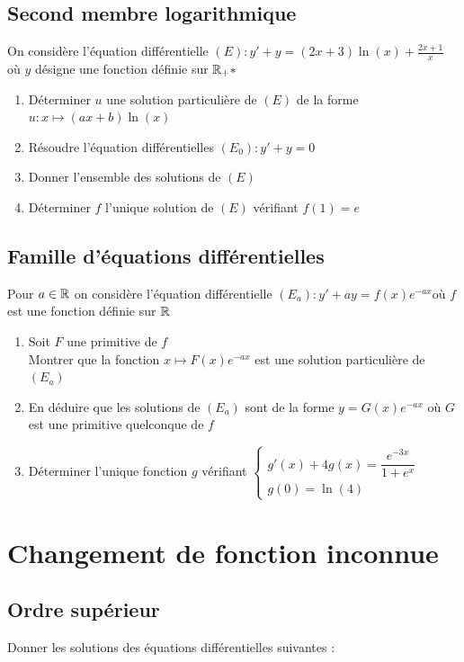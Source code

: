\documentclass[oneside,12pt]{book}          %
\begin{document}
\subsection{Second membre logarithmique}
On considère l'équation différentielle $(E):y'+y=(2x+3)\ln(x)+\frac{2x+1}{x}$ \quad où $y$ désigne une fonction définie sur ${\mathbb R}_+*$

\begin{enumerate}
    \item Déterminer $u$ une solution particulière de $(E)$ de la forme $u:x\mapsto(ax+b)\ln(x)$
    \item Résoudre l'équation différentielles $(E_0):y'+y=0$
    \item Donner l'ensemble des solutions de $(E)$
    \item Déterminer $f$ l'unique solution de $(E)$ vérifiant $f(1)=e$
\end{enumerate}



\subsection{Famille d'équations différentielles}
Pour $a\in{\mathbb R}$ on considère l'équation différentielle $(E_a):y'+ay=f(x)e^{-ax}$\quad où $f$ est une fonction définie sur ${\mathbb R}$
\begin{enumerate}
	\item Soit $F$ une primitive de $f$\\
	Montrer que la fonction $x\mapsto F(x)e^{-ax}$ est une solution particulière de $(E_a)$
	\item En déduire que les solutions de $(E_a)$ sont de la forme $y=G(x)e^{-ax}$ où $G$ est une primitive quelconque de $f$
	\item Déterminer l'unique fonction $g$ vérifiant $\begin{cases}g'(x)+4g(x)=\dfrac{e^{-3x}}{1+e^x}\\g(0)=\ln(4)\end{cases}$
\end{enumerate}




\section{Changement de fonction inconnue}

\subsection{Ordre supérieur}
Donner les solutions des équations différentielles suivantes :
\end{document}
